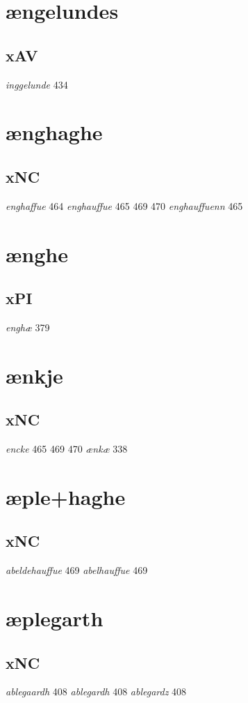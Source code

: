 \documentclass[a4paper,twocolumn]{article}
\begin{document}
\section{ængelundes}
\label{sec:orgcf2598f}
\subsection{xAV}
\label{sec:orgddf2074}
\emph{inggelunde} 434 
\section{ænghaghe}
\label{sec:org6fdeb60}
\subsection{xNC}
\label{sec:org06338ce}
\emph{enghaffue} 464 \emph{enghauffue} 465 469 470 \emph{enghauffuenn} 465 
\section{ænghe}
\label{sec:orgfa9641f}
\subsection{xPI}
\label{sec:org72a740d}
\emph{enghæ} 379 
\section{ænkje}
\label{sec:org466a084}
\subsection{xNC}
\label{sec:org9bd6371}
\emph{encke} 465 469 470 \emph{ænkæ} 338 
\section{æple+haghe}
\label{sec:orgab80f9d}
\subsection{xNC}
\label{sec:org731fa0d}
\emph{abeldehauffue} 469 \emph{abelhauffue} 469 
\section{æplegarth}
\label{sec:org5dcb065}
\subsection{xNC}
\label{sec:orgcf084ef}
\emph{ablegaardh} 408 \emph{ablegardh} 408 \emph{ablegardz} 408 
\end{document}
